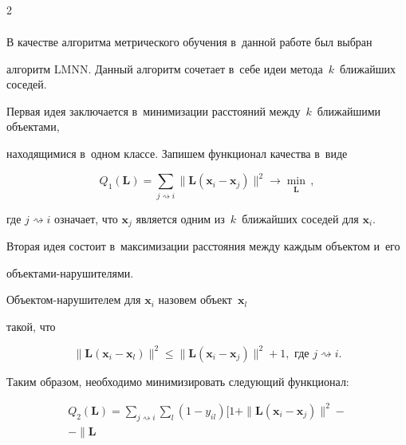 \begin{multicols}{2}
\begin{multline*}
\end{multline*}





В качестве алгоритма метрического обучения в~данной работе был выбран 


алгоритм LMNN. \mbox{Данный} алгоритм сочетает в~себе идеи метода~$k$~ближайших соседей. 


Первая идея заключается в~минимизации расстояний между~$k$~ближайшими объектами, 


находящимися в~одном клас\-се. Запишем функционал качества в~виде


$$


    Q_1(\mathbf{L}) = \sum\limits_{j \rightsquigarrow i} \|\mathbf{L}(\mathbf{x}_i - 


    \mathbf{x}_j)\|^2 \rightarrow \min\limits_{\mathbf{L}}\,,


$$


где $j \rightsquigarrow i$ означает, что $\mathbf{x}_j$ является одним из~$k$~ближайших соседей для $\mathbf{x}_i$.


Вторая идея состоит в~максимизации расстояния между каждым объектом и~его 


объ\-ек\-та\-ми-на\-ру\-ши\-те\-ля\-ми. 


Объек\-том-на\-ру\-ши\-те\-лем для $\mathbf{x}_i$ назовем объект~$\mathbf{x}_l$ 


такой, что


\begin{equation}


\label{impostor}


    \|\mathbf{L}(\mathbf{x}_i - \mathbf{x}_l)\|^2 \leq 


    \|\mathbf{L}(\mathbf{x}_i - \mathbf{x}_j)\|^2 + 1,  


    \mbox{ где } j \rightsquigarrow i.


\end{equation}


Таким образом, необходимо минимизировать следующий функционал:


\begin{multline*}


    Q_2(\mathbf{L}) = \sum\limits_{j \rightsquigarrow i} 


    \sum\limits_l(1 - y_{il})


    \bigl[1 + \|\mathbf{L}(\mathbf{x}_i - \mathbf{x}_j)\|^2 -{}\\


    {}- \|\mathbf{L}



\end{multline*}
\end{multicols}
